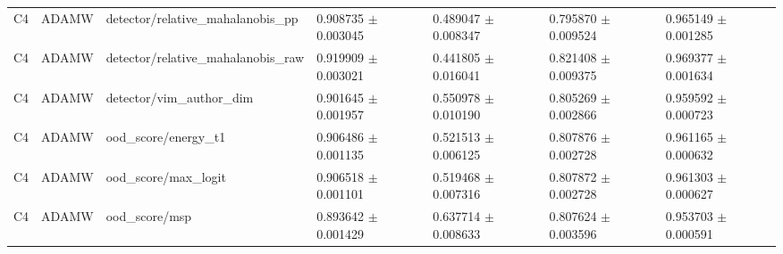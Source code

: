 \begin{longtable}{lllllll}
C4 & ADAMW & detector/relative\_mahalanobis\_pp & 0.908735 $\pm$ 0.003045 & 0.489047 $\pm$ 0.008347 & 0.795870 $\pm$ 0.009524 & 0.965149 $\pm$ 0.001285 \\
C4 & ADAMW & detector/relative\_mahalanobis\_raw & 0.919909 $\pm$ 0.003021 & 0.441805 $\pm$ 0.016041 & 0.821408 $\pm$ 0.009375 & 0.969377 $\pm$ 0.001634 \\
C4 & ADAMW & detector/vim\_author\_dim & 0.901645 $\pm$ 0.001957 & 0.550978 $\pm$ 0.010190 & 0.805269 $\pm$ 0.002866 & 0.959592 $\pm$ 0.000723 \\
C4 & ADAMW & ood\_score/energy\_t1 & 0.906486 $\pm$ 0.001135 & 0.521513 $\pm$ 0.006125 & 0.807876 $\pm$ 0.002728 & 0.961165 $\pm$ 0.000632 \\
C4 & ADAMW & ood\_score/max\_logit & 0.906518 $\pm$ 0.001101 & 0.519468 $\pm$ 0.007316 & 0.807872 $\pm$ 0.002728 & 0.961303 $\pm$ 0.000627 \\
C4 & ADAMW & ood\_score/msp & 0.893642 $\pm$ 0.001429 & 0.637714 $\pm$ 0.008633 & 0.807624 $\pm$ 0.003596 & 0.953703 $\pm$ 0.000591 \\
\end{longtable}
